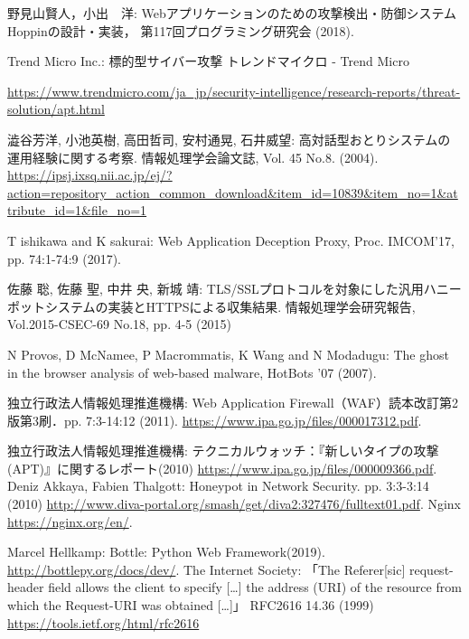 \documentclass{css}
\begin{document}
\begin{thebibliography}{10}
 野見山賢人，小出　洋: Webアプリケーションのための攻撃検出・防御システムHoppinの設計・実装，
第117回プログラミング研究会  (2018).

 Trend Micro Inc.: 標的型サイバー攻撃 \textbar トレンドマイクロ - Trend Micro\par
\url{https://www.trendmicro.com/ja_jp/security-intelligence/research-reports/threat-solution/apt.html}

 澁谷芳洋, 小池英樹, 高田哲司, 安村通晃, 石井威望: 高対話型おとりシステムの運用経験に関する考察. 情報処理学会論文誌, Vol. 45 No.8. (2004). \url{https://ipsj.ixsq.nii.ac.jp/ej/?action=repository_action_common_download&item_id=10839&item_no=1&attribute_id=1&file_no=1}

 T ishikawa and K sakurai: Web Application Deception Proxy, Proc. IMCOM'17, pp. 74:1-74:9 (2017).

 佐藤 聡, 佐藤 聖, 中井 央, 新城 靖: TLS/SSLプロトコルを対象にした汎用ハニーポットシステムの実装とHTTPSによる収集結果. 情報処理学会研究報告,  Vol.2015-CSEC-69 No.18, pp. 4-5 (2015)

 N Provos, D McNamee, P Macrommatis, K Wang and N Modadugu: The ghost in the browser analysis of web-based malware, HotBots '07 (2007).

 独立行政法人情報処理推進機構: Web Application Firewall（WAF）読本改訂第2版第3刷．pp. 7:3-14:12 (2011).
\url{https://www.ipa.go.jp/files/000017312.pdf}.

 独立行政法人情報処理推進機構: テクニカルウォッチ：『新しいタイプの攻撃(APT)』に関するレポート(2010)
\url{https://www.ipa.go.jp/files/000009366.pdf}.
 Deniz Akkaya, Fabien Thalgott: Honeypot in Network Security. pp. 3:3-3:14 (2010)
\url{http://www.diva-portal.org/smash/get/diva2:327476/fulltext01.pdf}.
  Nginx
\url{https://nginx.org/en/}.

 Marcel Hellkamp: Bottle: Python Web Framework(2019).
\url{http://bottlepy.org/docs/dev/}.
 The Internet Society: 「The Referer[sic] request-header field allows the client to specify […] the address (URI) of the resource from which the Request-URI was obtained […]」 RFC2616 14.36 (1999)
\url{https://tools.ietf.org/html/rfc2616}

\end{thebibliography}
\end{document}
